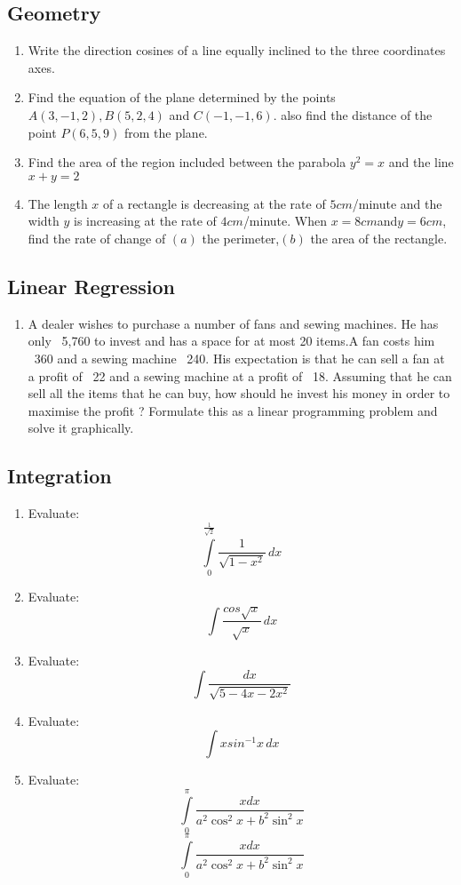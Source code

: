 \documentclass{article}
\begin{document}
\subsection*{Geometry}
\begin{enumerate}
\item 
Write the direction cosines of a line equally inclined to the three coordinates axes. 
\item 
Find the equation of the plane determined by the points $A(3, -1, 2), B(5, 2, 4)$ and $C(-1, -1, 6)$. also find the distance of the point $P(6, 5, 9)$ from the plane.
\item 
Find the area of the region included between the parabola ${y}^ {2} = x$ and the line $x + y = 2$
\item 
The length $x$ of a rectangle is decreasing at the rate of $5 cm$/minute and the width $y$ is increasing at the rate of $4 cm$/minute. When $x = 8 cm $and$ y = 6 cm$, find the rate of change of $(a)$ the perimeter,$ (b)$ the area of the rectangle.
\end{enumerate}

\subsection*{Linear Regression}
\begin{enumerate}
\item 
A dealer wishes to purchase a number of fans and sewing machines. He has only \rupee~5,760 to invest and has a space for at most 20 items.A fan costs him \rupee~360 and a sewing machine \rupee~240. His expectation is that he can sell a fan at a profit of \rupee~22 and a sewing machine at a profit of \rupee~18. Assuming that he can sell all the items that he can buy, how should he invest his money in order to maximise the profit ? Formulate this as a linear programming problem and solve it graphically.
\end{enumerate}

\subsection*{Integration}
\begin{enumerate}
\item Evaluate:
\[\int\limits_{0}^{\frac{1}{\sqrt{2}}} \frac{1}{\sqrt{1 - x^2}}\, dx\]
\item Evaluate:
\[\int\frac{cos\sqrt{x}}{\sqrt{x}}\, dx\]
\item Evaluate:
\[\int \frac{dx}{\sqrt{5-4x-2x^2}} \]
\vspace{10pt}
\item Evaluate:
\[\int x sin^{-1}{x}\,dx\]
\item Evaluate:
\[\int\limits_{0}^{\pi}\frac{x dx}{a^2 \cos^2 x + b^2 \sin^2 x}\]
\vspace{10pt}
\[\int\limits_{0}^{\pi} \frac{x dx}{a^2 \cos^2 x + b^2 \sin^2 x}\]
\end{enumerate}
\end{document}
